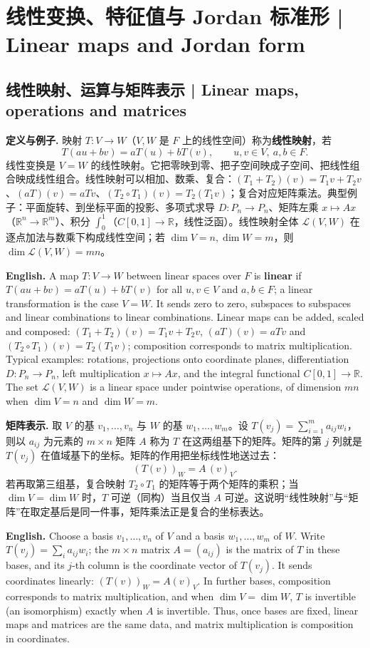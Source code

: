 \documentclass[UTF8,11pt,a4paper]{ctexart}
\newcommand{\EN}[1]{\par\noindent\textbf{English.} #1\par}
\begin{document}
\section[线性变换与 Jordan 标准形]{线性变换、特征值与 Jordan 标准形 | Linear maps and Jordan form}

\subsection{线性映射、运算与矩阵表示 | Linear maps, operations and matrices}
\noindent\textbf{定义与例子.} 映射 $T:V\to W$（$V,W$ 是 $F$ 上的线性空间）称为\textbf{线性映射}，若
\[
T(au+bv)=aT(u)+bT(v),\qquad u,v\in V,\ a,b\in F.
\]
线性变换是 $V=W$ 的线性映射。它把零映到零、把子空间映成子空间、把线性组合映成线性组合。线性映射可以相加、数乘、复合：$(T_1+T_2)(v)=T_1v+T_2v$、$(aT)(v)=aTv$、$(T_2\circ T_1)(v)=T_2(T_1v)$；复合对应矩阵乘法。典型例子：平面旋转、到坐标平面的投影、多项式求导 $D:P_n\to P_n$、矩阵左乘 $x\mapsto Ax$（$\mathbb R^n\to\mathbb R^m$）、积分 $\int_0^1$（$C[0,1]\to\mathbb R$，线性泛函）。线性映射全体 $\mathcal L(V,W)$ 在逐点加法与数乘下构成线性空间；若 $\dim V=n,\dim W=m$，则 $\dim\mathcal L(V,W)=mn$。
\EN{A map $T:V\to W$ between linear spaces over $F$ is \textbf{linear} if $T(au+bv)=aT(u)+bT(v)$ for all $u,v\in V$ and $a,b\in F$; a linear transformation is the case $V=W$. It sends zero to zero, subspaces to subspaces and linear combinations to linear combinations. Linear maps can be added, scaled and composed: $(T_1+T_2)(v)=T_1v+T_2v$, $(aT)(v)=aTv$ and $(T_2\circ T_1)(v)=T_2(T_1v)$; composition corresponds to matrix multiplication. Typical examples: rotations, projections onto coordinate planes, differentiation $D:P_n\to P_n$, left multiplication $x\mapsto Ax$, and the integral functional $C[0,1]\to\mathbb R$. The set $\mathcal L(V,W)$ is a linear space under pointwise operations, of dimension $mn$ when $\dim V=n$ and $\dim W=m$.}
\noindent\textbf{矩阵表示.} 取 $V$ 的基 $v_1,\dots,v_n$ 与 $W$ 的基 $w_1,\dots,w_m$。设 $T(v_j)=\sum_{i=1}^m a_{ij}w_i$，则以 $a_{ij}$ 为元素的 $m\times n$ 矩阵 $A$ 称为 $T$ 在这两组基下的矩阵。矩阵的第 $j$ 列就是 $T(v_j)$ 在值域基下的坐标。矩阵的作用把坐标线性地送过去：
\[
(T(v))_W=A\,(v)_V.
\]
若再取第三组基，复合映射 $T_2\circ T_1$ 的矩阵等于两个矩阵的乘积；当 $\dim V=\dim W$ 时，$T$ 可逆（同构）当且仅当 $A$ 可逆。这说明“线性映射”与“矩阵”在取定基后是同一件事，矩阵乘法正是复合的坐标表达。
\EN{Choose a basis $v_1,\dots,v_n$ of $V$ and a basis $w_1,\dots,w_m$ of $W$. Write $T(v_j)=\sum_i a_{ij}w_i$; the $m\times n$ matrix $A=(a_{ij})$ is the matrix of $T$ in these bases, and its $j$-th column is the coordinate vector of $T(v_j)$. It sends coordinates linearly: $(T(v))_W=A(v)_V$. In further bases, composition corresponds to matrix multiplication, and when $\dim V=\dim W$, $T$ is invertible (an isomorphism) exactly when $A$ is invertible. Thus, once bases are fixed, linear maps and matrices are the same data, and matrix multiplication is composition in coordinates.}
\end{document}
